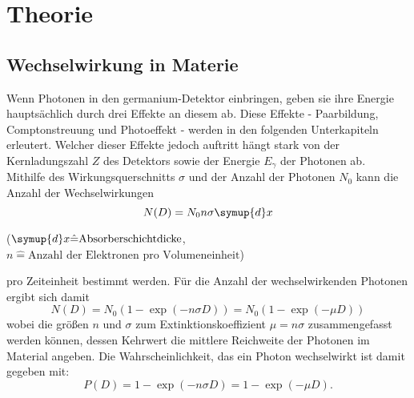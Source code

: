\section{Theorie}
\subsection{Wechselwirkung in Materie}
Wenn Photonen in den germanium-Detektor einbringen, geben sie ihre Energie hauptsächlich durch drei Effekte an diesem ab. Diese Effekte - Paarbildung, Comptonstreuung und Photoeffekt - werden in den folgenden Unterkapiteln erleutert. Welcher dieser Effekte jedoch auftritt hängt stark von der Kernladungszahl $Z$ des Detektors sowie der Energie $E_\gamma$ der Photonen ab. \\
Mithilfe des Wirkungsquerschnitts $\sigma$ und der Anzahl der Photonen $N_0$ kann die Anzahl der Wechselwirkungen
\begin{equation}
    N(D) = N_0 n \sigma \symup{d}x
\end{equation}
\begin{center}
    \tiny($ \symup{d}x \hat{=} \text{Absorberschichtdicke}$, $n \hat{=} \text{Anzahl der Elektronen pro Volumeneinheit}$)
\end{center}
pro Zeiteinheit bestimmt werden.
Für die Anzahl der wechselwirkenden Photonen ergibt sich damit
\begin{equation}
    N(D) = N_0 \left( 1 - \exp{(- n \sigma D )} \right) = N_0 \left( 1 - \exp{(- \mu D )} \right)
\end{equation}
wobei die größen $n$ und $\sigma$ zum Extinktionskoeffizient $\mu = n \sigma$ zusammengefasst werden können, dessen Kehrwert die mittlere Reichweite der Photonen im Material angeben.
Die Wahrscheinlichkeit, das ein Photon wechselwirkt ist damit gegeben mit:
\begin{equation}
    P(D) = 1 - \exp{(- n \sigma D )}=  1 - \exp{(- \mu D )}.
\end{equation}


